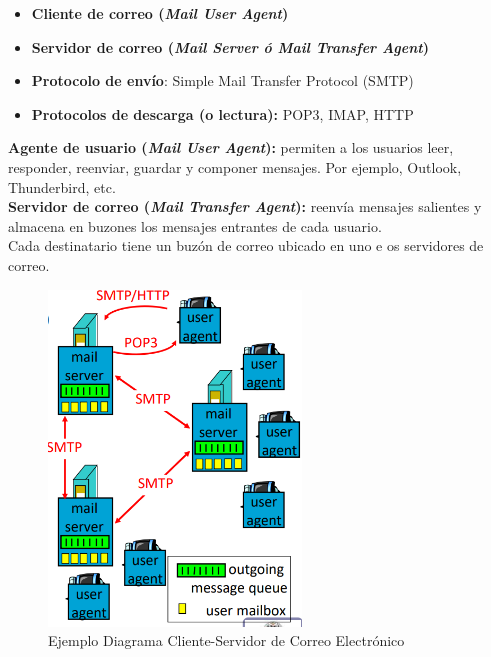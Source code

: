 \documentclass[a4paper,11pt]{article}
\begin{document}
\begin{itemize}
\item \textbf{Cliente de correo (\textit{Mail User Agent})}

\item \textbf{Servidor de correo (\textit{Mail Server ó Mail Transfer Agent})}

\item \textbf{Protocolo de envío}: Simple Mail Transfer Protocol (SMTP)

\item \textbf{Protocolos de descarga (o lectura):} POP3, IMAP, HTTP
\end{itemize}

\textbf{Agente de usuario (\textit{Mail User Agent}):} permiten a los usuarios leer, responder, reenviar, guardar y componer mensajes. Por ejemplo, Outlook, Thunderbird, etc. \\

\textbf{Servidor de correo (\textit{Mail Transfer Agent}):} reenvía mensajes salientes y almacena en buzones los mensajes entrantes de cada usuario. \\

Cada destinatario tiene un buzón de correo ubicado en uno e os servidores de correo.

\begin{figure}[h]
\centering
\caption{Ejemplo Diagrama Cliente-Servidor de Correo Electrónico}
\includegraphics[scale=1,width=0.6\textwidth]{ejemplo_smtp.png}
\end{figure}
\end{document}
